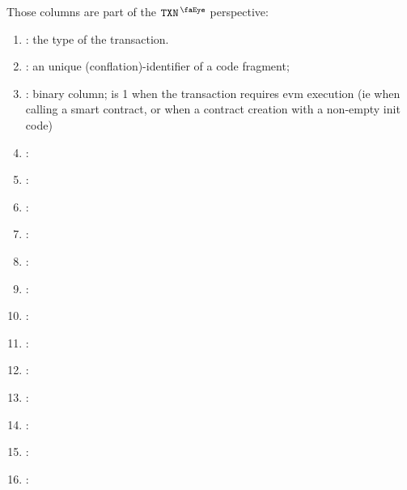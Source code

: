 Those columns are part of the $\isTxn$ perspective:
\begin{enumerate}[resume]
    \item \txType{}:
    the type of the transaction.
    \item \CFI{}: 
    an unique (conflation)-identifier of a code fragment;
    \item \txRequiresEvmExecution{}:
    binary column; is 1 when the transaction requires evm execution (ie when calling a smart contract, or when a contract creation with a non-empty init code)
    \item \chainId{}:
    \item \nonce{}:
    \item \gasPrice{}: 
    \item \phaseMaxPriorityFeePerGas{}: 
    \item \maxFeePerGas{}: 
    \item \gasLimit{}: 
    \item \toHi{}:
    \item \toLo{}: 
    \item \value{}: 
    \item \dataSize{}:
    \item \dataCost{}:
    \item \nbWarmedAddress{}:
    \item \nbWarmedStorageKey{}:  
\end{enumerate}
